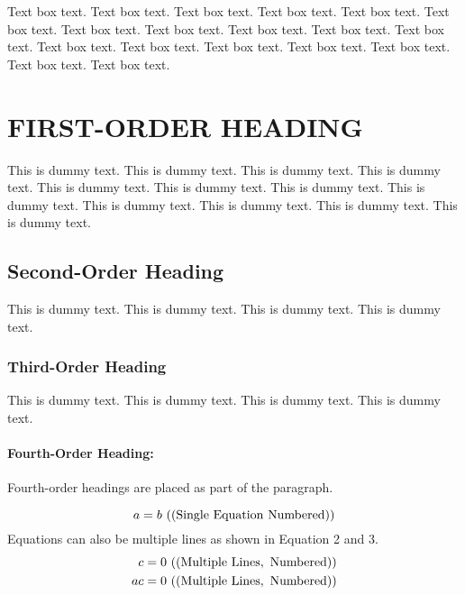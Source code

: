 \documentclass{ar-1col}
\begin{document}
\begin{textbox}
Text box text. Text box text. Text box text. Text box text. Text box text. Text box text.
Text box text. Text box text. Text box text. Text box text. Text box text. Text box text.
Text box text. Text box text. Text box text. Text box text. Text box text. Text box text.
\end{textbox}


\section{FIRST-ORDER HEADING}
This is dummy text. This is dummy text. This is dummy text. This is dummy text. This is dummy text. This is dummy text. This is dummy text. This is dummy text. This is dummy text. This is dummy text. This is dummy text. This is dummy text.

\subsection{Second-Order Heading}
This is dummy text. This is dummy text. This is dummy text. This is dummy text.

\subsubsection{Third-Order Heading}
This is dummy text. This is dummy text. This is dummy text. This is dummy text. 

\paragraph{Fourth-Order Heading:} Fourth-order headings are placed as part of the paragraph.



\begin{marginnote}
\end{marginnote}

\begin{equation}
a = b \ {\rm ((Single\ Equation\ Numbered))}
\end{equation}
Equations can also be multiple lines as shown in Equation 2 and 3.
\begin{eqnarray}
c = 0 \ {\rm ((Multiple\  Lines, \ Numbered))}\\
ac = 0 \ {\rm ((Multiple \ Lines, \ Numbered))}
\end{eqnarray}
\end{document}
